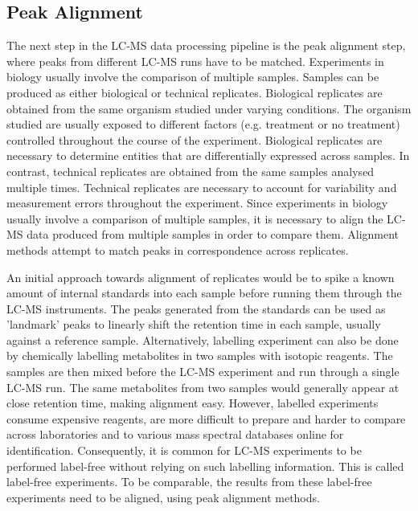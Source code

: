 \subsection{Peak Alignment\label{sub:alignment-tools}}

The next step in the LC-MS data processing pipeline is the peak alignment step, where peaks from different LC-MS runs have to be matched. Experiments in biology usually involve the comparison of multiple samples. Samples can be produced as either biological or technical replicates. Biological replicates are obtained from the same organism studied under varying conditions. The organism studied are usually exposed to different factors (e.g. treatment or no treatment) controlled throughout the course of the experiment. Biological replicates are necessary to determine entities that are differentially expressed across samples. In contrast, technical replicates are obtained from the same samples analysed multiple times. Technical replicates are necessary to account for variability and measurement errors throughout the experiment. Since experiments in biology usually involve a comparison of multiple samples, it is necessary to align the LC-MS data produced from multiple samples in order to compare them. Alignment methods attempt to match peaks in correspondence across replicates. 

An initial approach towards alignment of replicates would be to spike a known amount of internal standards into each sample before running them through the LC-MS instruments. The peaks generated from the standards can be used as 'landmark' peaks to linearly shift the retention time in each sample, usually against a reference sample. Alternatively, labelling experiment can also be done by chemically labelling metabolites in two samples with isotopic reagents. The samples are then mixed before the LC-MS experiment and run through a single LC-MS run. The same metabolites from two samples would generally appear at close retention time, making alignment easy. However, labelled experiments consume expensive reagents, are more difficult to prepare and harder to compare across laboratories and to various mass spectral databases online for identification. Consequently, it is common for LC-MS experiments to be performed label-free without relying on such labelling information. This is called label-free experiments. To be comparable, the results from these label-free experiments need to be aligned, using peak alignment methods.


